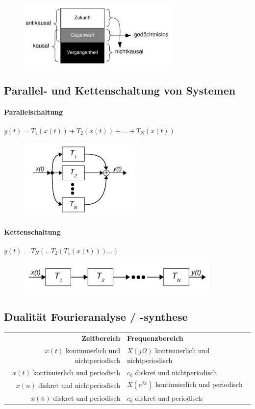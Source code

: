 \documentclass[10pt,a4paper]{article}
\begin{document}
\begin{figure}[H]
	\centering
	\includegraphics[width=8cm]{img/ZeiteigenschaftenVonSystemen}
\end{figure}

\subsection*{Parallel- und Kettenschaltung von Systemen}
\paragraph{Parallelschaltung} $y(t)=T_1(x(t))+T_2(x(t))+...+T_N(x(t))$
\begin{figure}[H]
	\centering
	\includegraphics[width=6cm]{img/Systemparallelschaltung}
\end{figure}

\paragraph{Kettenschaltung} $y(t)=T_N(...T_2(T_1(x(t)))...)$
\begin{figure}[H]
	\centering
	\includegraphics[width=10cm]{img/Systemkettenschaltung}
\end{figure}

\subsection*{Dualität Fourieranalyse / -synthese}
\begin{table}[H]
	\centering
	\begin{tabular}{r l}
	\textbf{Zeitbereich} & \textbf{Frequenzbereich} \\
	$x(t)$ kontinuierlich und nichtperiodisch & $X(j\Omega)$ kontinuierlich und nichtperiodisch \\
	$x(t)$ kontinuierlich und periodisch & $c_k$ diskret und nichtperiodisch \\
	$x(n)$ diskret und nichtperiodisch & $X\left(e^{j\omega}\right)$ kontinuierlich und periodisch \\
	$x(n)$ diskret und periodisch & $c_k$ diskret und periodisch
\end{tabular}
\end{table}
\end{document}
